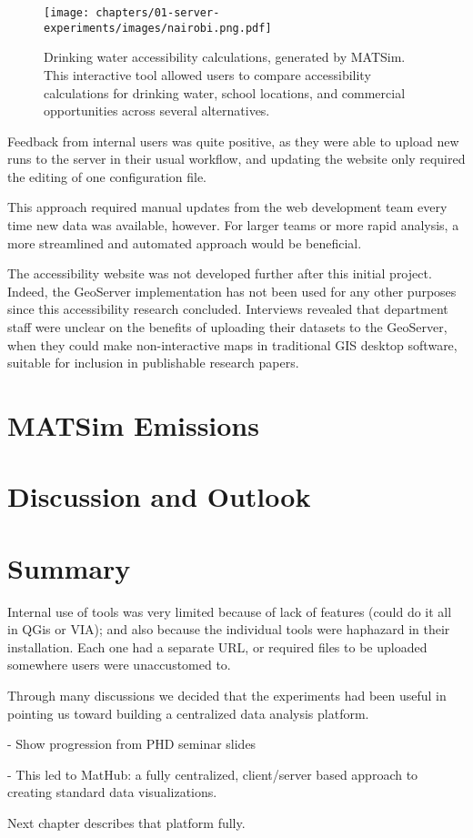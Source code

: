 \begin{figure}[!ht]
  \texttt{[image: chapters/01-server-experiments/images/nairobi.png.pdf]}
  \caption{Drinking water accessibility calculations, generated by MATSim. This interactive tool allowed users to compare accessibility calculations for drinking water, school locations, and commercial opportunities across several alternatives.}
  \label{fig:nairobi}
\end{figure}

Feedback from internal users was quite positive, as they were able to upload new runs to the server in their usual workflow, and updating the website only required the editing of one configuration file.

This approach required manual updates from the web development team every time new data was available, however. For larger teams or more rapid analysis, a more streamlined and automated approach would be beneficial.

The accessibility website was not developed further after this initial project. Indeed, the GeoServer implementation has not been used for any other purposes since this accessibility research concluded. Interviews revealed that department staff were unclear on the benefits of uploading their datasets to the GeoServer, when they could make non-interactive maps in traditional GIS desktop software, suitable for inclusion in publishable research papers.

\hypertarget{server-experiments-emissions}{%
\section{MATSim Emissions}\label{server-experiments-emissions}}

\hypertarget{server-experiments-findings}{%
\section{Discussion and Outlook}\label{server-experiments-findings}}

\hypertarget{server-experiments-summary}{%
\section{Summary}\label{server-experiments-summary}}


Internal use of tools was very limited because of lack of features (could do it all in QGis or VIA); and also because the individual tools were haphazard in their installation. Each one had a separate URL, or required files to be uploaded somewhere users were unaccustomed to.

Through many discussions we decided that the experiments had been useful in pointing us toward building a centralized data analysis platform.

- Show progression from PHD seminar slides

- This led to MatHub: a fully centralized, client/server based approach to creating standard data visualizations.

Next chapter describes that platform fully.


